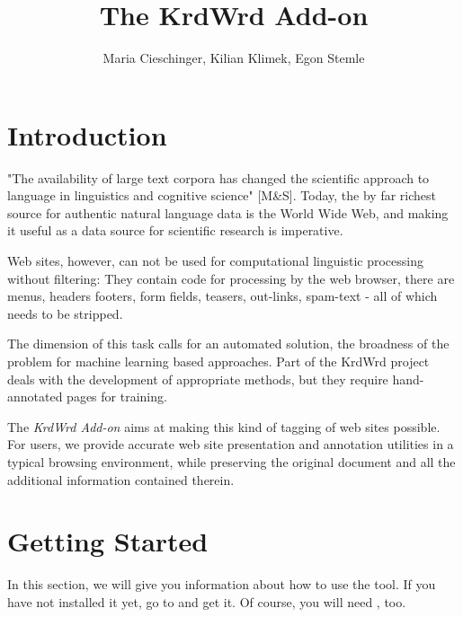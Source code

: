 \documentclass[12pt]{article}
\title{The KrdWrd Add-on}
\author{Maria Cieschinger, Kilian Klimek, Egon Stemle}
\begin{document}
\maketitle

\section{Introduction}


"The availability of large text corpora has changed the scientific approach to language in linguistics and cognitive science" [M\&S].
Today, the by far richest source for authentic natural language data is the World Wide Web, and making it useful as a data source for scientific research is imperative.

Web sites, however, can not be used for computational linguistic processing without filtering:
They contain code for processing by the web browser, there are menus, headers footers, form fields, teasers, out-links, spam-text - all of which needs to be stripped.

The dimension of this task calls for an automated solution, the broadness of the problem for machine learning based approaches.
Part of the KrdWrd project deals with the development of appropriate methods, but they require hand-annotated pages for training.

The \textit{KrdWrd Add-on} aims at making this kind of tagging of web sites possible.
For users, we provide accurate web site presentation and annotation utilities in a typical browsing environment, while preserving the original document and all the additional information contained therein.


\section{Getting Started}
In this section, we will give you information about how to use the tool. If you have not installed it yet, go to  and get it. Of course, you will need , too. \\
\end{document}
